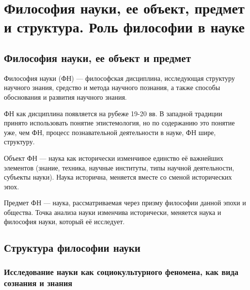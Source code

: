 \section{Философия науки, ее объект, предмет и структура. Роль философии в науке }   

\subsection{Философия науки, ее объект и предмет}





Философия науки (ФН) --- философская дисциплина, исследующая структуру научного знания, средство и 
метода научного познания, а также способы обоснования и развития научного знания.

ФН как дисциплина появляется на рубеже 19-20 вв. В западной традиции принято 
использовать понятие эпистемология, но по содержанию это понятие уже, чем ФН, процесс познавательной 
деятельности в науке, ФН шире, структуру.

Объект ФН --- наука как исторически изменчивое единство её важнейших элементов (знание, техника, 
научные институты, типы научной деятельности, субъекты науки). Наука исторична, меняется вместе со 
сменой исторических эпох.
 
Предмет ФН --- наука, рассматриваемая через призму философии данной эпохи и общества. Точка анализа 
науки изменчива исторически, меняется наука и философия науки, который её исследует.

\subsection{Структура философии науки}

\subsubsection{Исследование науки как социокультурного феномена, как вида сознания и знания}

